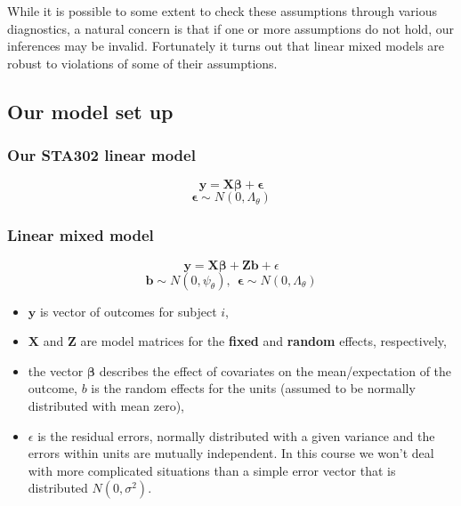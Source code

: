 \documentclass[
  openany]{book}
\providecommand{\tightlist}{%
  \setlength{\itemsep}{0pt}\setlength{\parskip}{0pt}}
\begin{document}
While it is possible to some extent to check these assumptions through various diagnostics, a natural concern is that if one or more assumptions do not hold, our inferences may be invalid. Fortunately it turns out that linear mixed models are robust to violations of some of their assumptions.

\hypertarget{our-model-set-up}{%
\subsection{Our model set up}\label{our-model-set-up}}

\hypertarget{our-sta302-linear-model}{%
\subsubsection{Our STA302 linear model}\label{our-sta302-linear-model}}

\[\boldsymbol{y} = \boldsymbol{X\beta} + \boldsymbol{\epsilon}\]
\[\boldsymbol{\epsilon} \sim N(0, \Lambda_\theta)\]

\hypertarget{linear-mixed-model}{%
\subsubsection{Linear mixed model}\label{linear-mixed-model}}

\[\boldsymbol{y} = \boldsymbol{X\beta} + \boldsymbol{Zb} + \epsilon\]
\[\boldsymbol{b} \sim N(0, \psi_\theta),\ \  \boldsymbol{\epsilon} \sim N(0, \Lambda_\theta)\]

\begin{itemize}
\tightlist
\item
  \(\boldsymbol{y}\) is vector of outcomes for subject \(i\),
\item
  \(\boldsymbol{X}\) and \(\boldsymbol{Z}\) are model matrices for the \textbf{fixed} and \textbf{random} effects, respectively,
\item
  the vector \(\boldsymbol{\beta}\) describes the effect of covariates on the mean/expectation of the outcome, \(b\) is the random effects for the units (assumed to be normally distributed with mean zero),
\item
  \(\epsilon\) is the residual errors, normally distributed with a given variance and the errors within units are mutually independent. In this course we won't deal with more complicated situations than a simple error vector that is distributed \(N(0, \sigma^2)\).
\end{itemize}
\end{document}
